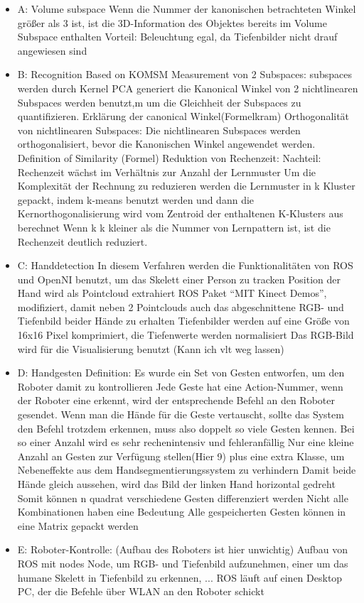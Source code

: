 \documentclass{llncs}
\begin{document}
\begin{itemize}
\item A: Volume subspace
\subitem Wenn die Nummer der kanonischen betrachteten Winkel gr\"o\ss{}er als 3 ist, ist die 3D-Information des Objektes bereits im Volume Subspace enthalten
\subitem Vorteil: Beleuchtung egal, da Tiefenbilder nicht drauf angewiesen sind
\item B: Recognition Based on KOMSM
\subitem Measurement von 2 Subspaces: 
\subsubitem subspaces werden durch Kernel PCA generiert
\subsubitem die Kanonical Winkel von 2 nichtlinearen Subspaces werden benutzt,m um die Gleichheit der Subspaces zu quantifizieren.
\subsubitem Erkl\"arung der canonical Winkel(Formelkram)
\subitem Orthogonalität von nichtlinearen Subspaces: 
\subsubitem Die nichtlinearen Subspaces werden orthogonalisiert, bevor die Kanonischen Winkel angewendet werden.
\subitem Definition of Similarity
\subsubitem (Formel)
\subitem Reduktion von Rechenzeit:
\subsubitem Nachteil: Rechenzeit wächst im Verhältnis zur Anzahl der Lernmuster
\subsubitem Um die Komplexität der Rechnung zu reduzieren werden die Lernmuster in k Kluster gepackt, indem k-means benutzt werden und dann die Kernorthogonalisierung wird vom Zentroid der enthaltenen K-Klusters aus berechnet
\subsubitem Wenn k k kleiner als die Nummer von Lernpattern ist, ist die Rechenzeit deutlich reduziert. 
\item C: Handdetection
\subitem In diesem Verfahren werden die Funktionalitäten von ROS und OpenNI benutzt, um das Skelett einer Person zu tracken
\subitem Position der Hand wird als Pointcloud extrahiert
\subitem ROS Paket ``MIT Kinect Demos'', modifiziert, damit neben 2 Pointclouds auch das abgeschnittene RGB- und Tiefenbild beider Hände zu erhalten
\subitem Tiefenbilder werden auf eine Größe von 16x16 Pixel komprimiert, die Tiefenwerte werden normalisiert
\subitem Das RGB-Bild wird für die Visualisierung benutzt (Kann ich vlt weg lassen)
\item D: Handgesten Definition:
\subitem Es wurde ein Set von Gesten entworfen, um den Roboter damit zu kontrollieren
\subitem Jede Geste hat eine Action-Nummer, wenn der Roboter eine erkennt, wird der entsprechende Befehl an den Roboter gesendet.
\subitem Wenn man die Hände für die Geste vertauscht, sollte das System den Befehl trotzdem erkennen, muss also doppelt so viele Gesten kennen. Bei so einer Anzahl wird es sehr rechenintensiv und fehleranfällig
\subsubitem Nur eine kleine Anzahl an Gesten zur Verfügung stellen(Hier 9) plus eine extra Klasse, um Nebeneffekte aus dem Handsegmentierungssystem zu verhindern
\subitem Damit beide Hände gleich aussehen, wird das Bild der linken Hand horizontal gedreht 
\subsubitem Somit können n quadrat verschiedene Gesten differenziert werden 
\subitem Nicht alle Kombinationen haben eine Bedeutung
\subitem Alle gespeicherten Gesten können in eine Matrix gepackt werden 
\item E: Roboter-Kontrolle:
\subitem (Aufbau des Roboters ist hier unwichtig)
\subitem Aufbau von ROS mit nodes
\subitem Node, um RGB- und Tiefenbild aufzunehmen, einer um das humane Skelett in Tiefenbild zu erkennen, ...
\subitem ROS läuft auf einen Desktop PC, der die Befehle über WLAN an den Roboter schickt
\end{itemize}
\end{document}
